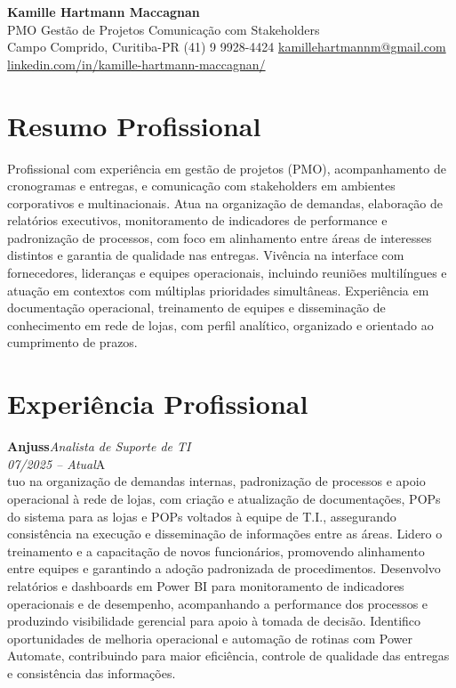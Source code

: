 \documentclass[11pt,a4paper]{article}
\newcommand{\cvrole}[4]{%
  \vspace{4pt}%
  {\bfseries\color{accentcolor}#1}\hfill{\itshape #2}\\[-2pt]%
  {\itshape #3}\hfill #4\\[6pt]%
}
\begin{document}
\begin{center}
  {\fontsize{20}{24}\selectfont\bfseries Kamille Hartmann Maccagnan}\\[8pt]
  {\large PMO \textbar{} Gestão de Projetos \textbar{} Comunicação com Stakeholders}\\[10pt]
  Campo Comprido, Curitiba-PR \enspace\textbullet\enspace (41) 9 9928-4424 \enspace\textbullet\enspace
  \href{mailto:kamillehartmannm@gmail.com}{kamillehartmannm@gmail.com}\\[3pt]
  \href{https://linkedin.com/in/kamille-hartmann-maccagnan/}{linkedin.com/in/kamille-hartmann-maccagnan/}
\end{center}

\vspace{6pt}

\section{Resumo Profissional}

Profissional com experiência em gestão de projetos (PMO), acompanhamento de cronogramas e entregas, e comunicação com stakeholders em ambientes corporativos e multinacionais. Atua na organização de demandas, elaboração de relatórios executivos, monitoramento de indicadores de performance e padronização de processos, com foco em alinhamento entre áreas de interesses distintos e garantia de qualidade nas entregas. Vivência na interface com fornecedores, lideranças e equipes operacionais, incluindo reuniões multilíngues e atuação em contextos com múltiplas prioridades simultâneas. Experiência em documentação operacional, treinamento de equipes e disseminação de conhecimento em rede de lojas, com perfil analítico, organizado e orientado ao cumprimento de prazos.

\section{Experiência Profissional}

\cvrole{Anjuss}{Analista de Suporte de TI}{07/2025 -- Atual}

Atuo na organização de demandas internas, padronização de processos e apoio operacional à rede de lojas, com criação e atualização de documentações, POPs do sistema para as lojas e POPs voltados à equipe de T.I., assegurando consistência na execução e disseminação de informações entre as áreas. Lidero o treinamento e a capacitação de novos funcionários, promovendo alinhamento entre equipes e garantindo a adoção padronizada de procedimentos. Desenvolvo relatórios e dashboards em Power BI para monitoramento de indicadores operacionais e de desempenho, acompanhando a performance dos processos e produzindo visibilidade gerencial para apoio à tomada de decisão. Identifico oportunidades de melhoria operacional e automação de rotinas com Power Automate, contribuindo para maior eficiência, controle de qualidade das entregas e consistência das informações.
\end{document}
